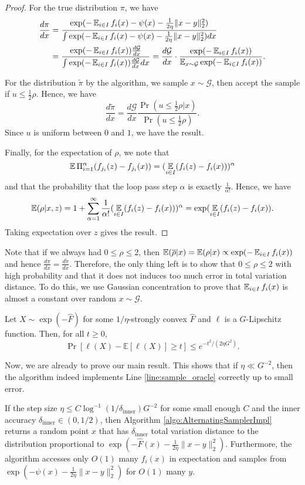 \begin{proof}
For the true distribution $\pi$, we have
\begin{align*}
\frac{d\pi}{dx} & =\frac{\exp(-\operatorname*{\mathbb{E}}_{i\in I}f_{i}(x)-\psi(x)-\frac{1}{2\eta}\|x-y\|_{2}^{2})}{\int\exp(-\operatorname*{\mathbb{E}}_{i\in I}f_{i}(x)-\psi(x)-\frac{1}{2\eta}\|x-y\|_{2}^{2})dx} \\
& = \frac{\exp(-\operatorname*{\mathbb{E}}_{i\in I}f_{i}(x))\frac{d\mathcal{G}}{dx}}{\int\exp(-\operatorname*{\mathbb{E}}_{i\in I}f_{i}(x))\frac{d\mathcal{G}}{dx}dx}=\frac{d\mathcal{G}}{dx}\cdot\frac{\exp(-\operatorname*{\mathbb{E}}_{i\in I}f_{i}(x))}{\operatorname*{\mathbb{E}}_{x\sim\mathcal{G}}\exp(-\operatorname*{\mathbb{E}}_{i\in I}f_{i}(x))}.
\end{align*}

For the distribution $\widetilde{\pi}$ by the algorithm, we sample
$x\sim\mathcal{G}$, then accept the sample if $u\leq\frac{1}{2}\rho$.
Hence, we have
\[
\frac{d\widetilde{\pi}}{dx}=\frac{d\mathcal{G}}{dx}\frac{\Pr(u\leq\frac{1}{2}\rho|x)}{\Pr(u\leq\frac{1}{2}\rho)}.
\]
Since $u$ is uniform between $0$ and $1$, we have the result.

Finally, for the expectation of $\rho$, we note that 
\[
\operatorname*{\mathbb{E}}\Pi_{i=1}^{\alpha}(f_{j_{i}}(z)-f_{j_{i}}(x))=(\operatorname*{\mathbb{E}}_{i\in I}(f_{i}(z)-f_{i}(x)))^{\alpha}
\]
and that the probability that the loop pass step $\alpha$ is exactly
$\frac{1}{\alpha!}$. Hence, we have 
\[
\operatorname*{\mathbb{E}}(\rho|x,z)=1+\sum_{\alpha=1}^{\infty}\frac{1}{\alpha!}(\operatorname*{\mathbb{E}}_{i\in I}(f_{i}(z)-f_{i}(x)))^{\alpha}=\exp(\operatorname*{\mathbb{E}}_{i\in I}(f_{i}(z)-f_{i}(x)).
\]
Taking expectation over $z$ gives the result.
\end{proof}
Note that if we always had $0 \leq \rho\leq2$, then $\operatorname*{\mathbb{E}}(\overline{\rho}|x)=\operatorname*{\mathbb{E}}(\rho|x)\propto\exp(-\operatorname*{\mathbb{E}}_{i\in I}f_{i}(x))$
and hence $\frac{d\pi}{dx}=\frac{d\widetilde{\pi}}{dx}$. Therefore,
the only thing left is to show that $0\leq \rho\leq2$ with high probability
and that it does not induces too much error in total variation distance.
To do this, we use Gaussian concentration to prove that $\operatorname*{\mathbb{E}}_{i\in I}f_{i}(x)$
is almost a constant over random $x\sim\mathcal{G}$.
\begin{lem}
\label{lem:gaussian_concentration}Let $X \sim \exp(-\widehat{F})$ for some $1/\eta$-strongly convex $\widehat{F}$ and $\ell$
is a $G$-Lipschitz function. Then, for all $t\geq0$,
\[
\Pr[\ell(X)-\mathbb{E}[\ell(X)]\geq t]\leq e^{-t^{2}/(2\eta G^2)}.
\]
\end{lem}

Now, we are already to prove our main result. This shows that if $\eta\ll G^{-2}$,
then the algorithm indeed implements Line \ref{line:sample_oracle}
correctly up to small error.
\begin{lem}
\label{lem:sub_problem}If the step size $\eta\leq C\log^{-1}(1/\delta_{\mathrm{inner}})G^{-2}$
for some small enough $C$ and the inner accuracy $\delta_{\mathrm{inner}}\in(0,1/2)$,
then Algorithm \ref{algo:AlternatingSamplerImpl} returns a random
point $x$ that has $\delta_{\mathrm{inner}}$ total variation distance
to the distribution proportional to $\exp(-\widehat{F}(x)-\frac{1}{2\eta}\|x-y\|_{2}^{2})$. Furthermore,
the algorithm accesses only $O(1)$ many $f_{i}(x)$ in expectation and samples from $\exp(-\psi(x) - \frac{1}{2\eta} \|x-y\|^2_2)$ for $O(1)$ many $y$.
\end{lem}

